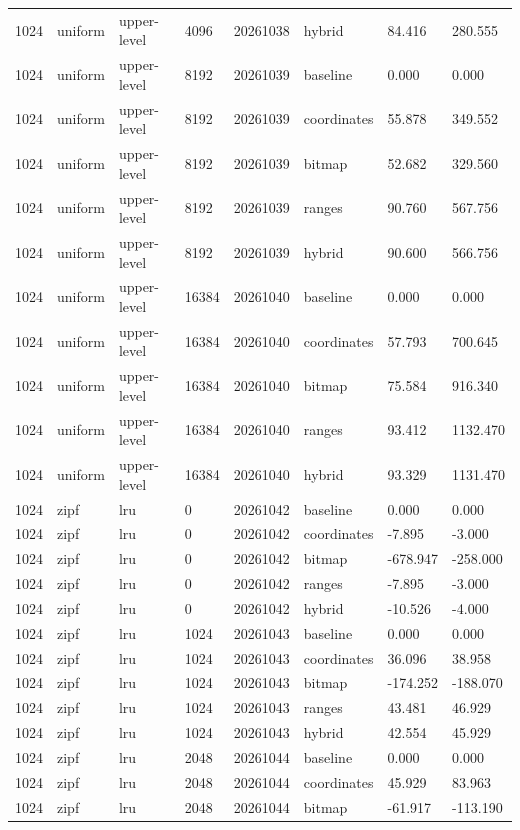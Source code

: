 \begin{tabular}{llllllll}
1024 & uniform & upper-level & 4096 & 20261038 & hybrid & 84.416 & 280.555 \\
1024 & uniform & upper-level & 8192 & 20261039 & baseline & 0.000 & 0.000 \\
1024 & uniform & upper-level & 8192 & 20261039 & coordinates & 55.878 & 349.552 \\
1024 & uniform & upper-level & 8192 & 20261039 & bitmap & 52.682 & 329.560 \\
1024 & uniform & upper-level & 8192 & 20261039 & ranges & 90.760 & 567.756 \\
1024 & uniform & upper-level & 8192 & 20261039 & hybrid & 90.600 & 566.756 \\
1024 & uniform & upper-level & 16384 & 20261040 & baseline & 0.000 & 0.000 \\
1024 & uniform & upper-level & 16384 & 20261040 & coordinates & 57.793 & 700.645 \\
1024 & uniform & upper-level & 16384 & 20261040 & bitmap & 75.584 & 916.340 \\
1024 & uniform & upper-level & 16384 & 20261040 & ranges & 93.412 & 1132.470 \\
1024 & uniform & upper-level & 16384 & 20261040 & hybrid & 93.329 & 1131.470 \\
1024 & zipf & lru & 0 & 20261042 & baseline & 0.000 & 0.000 \\
1024 & zipf & lru & 0 & 20261042 & coordinates & -7.895 & -3.000 \\
1024 & zipf & lru & 0 & 20261042 & bitmap & -678.947 & -258.000 \\
1024 & zipf & lru & 0 & 20261042 & ranges & -7.895 & -3.000 \\
1024 & zipf & lru & 0 & 20261042 & hybrid & -10.526 & -4.000 \\
1024 & zipf & lru & 1024 & 20261043 & baseline & 0.000 & 0.000 \\
1024 & zipf & lru & 1024 & 20261043 & coordinates & 36.096 & 38.958 \\
1024 & zipf & lru & 1024 & 20261043 & bitmap & -174.252 & -188.070 \\
1024 & zipf & lru & 1024 & 20261043 & ranges & 43.481 & 46.929 \\
1024 & zipf & lru & 1024 & 20261043 & hybrid & 42.554 & 45.929 \\
1024 & zipf & lru & 2048 & 20261044 & baseline & 0.000 & 0.000 \\
1024 & zipf & lru & 2048 & 20261044 & coordinates & 45.929 & 83.963 \\
1024 & zipf & lru & 2048 & 20261044 & bitmap & -61.917 & -113.190 \\

\end{tabular}
